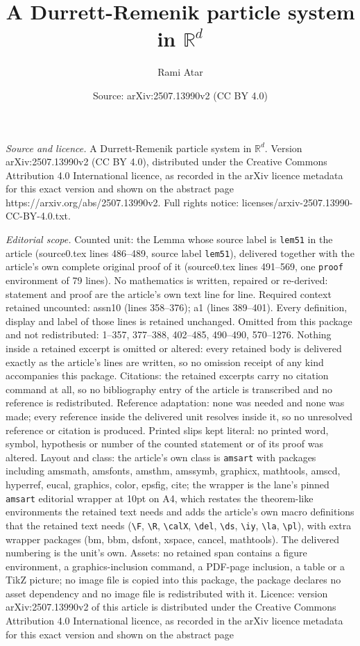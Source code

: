 \documentclass[10pt,a4paper]{amsart}
\title[A Durrett-Remenik particle system in $\mathbb{R}^d$]{A Durrett-Remenik particle system in $\mathbb{R}^d$}
\author{Rami Atar}
\date{Source: arXiv:2507.13990v2 (CC BY 4.0)}
\begin{document}
\maketitle

\noindent\emph{Source and licence.} A Durrett-Remenik particle system in $\mathbb{R}^d$. Version arXiv:2507.13990v2 (CC BY 4.0), distributed under the Creative Commons Attribution 4.0 International licence, as recorded in the arXiv licence metadata for this exact version and shown on the abstract page https://arxiv.org/abs/2507.13990v2. Full rights notice: licenses/arxiv-2507.13990-CC-BY-4.0.txt.\par\smallskip

\noindent\textit{Editorial scope.} Counted unit: the Lemma whose source label is \texttt{lem51} in the article (source0.tex lines 486--489, source label \texttt{lem51}), delivered together with the article's own complete original proof of it (source0.tex lines 491--569, one \texttt{proof} environment of 79 lines). No mathematics is written, repaired or re-derived: statement and proof are the article's own text line for line. Required context retained uncounted: assn10 (lines 358--376); a1 (lines 389--401). Every definition, display and label of those lines is retained unchanged. Omitted from this package and not redistributed: 1--357, 377--388, 402--485, 490--490, 570--1276. Nothing inside a retained excerpt is omitted or altered: every retained body is delivered exactly as the article's lines are written, so no omission receipt of any kind accompanies this package. Citations: the retained excerpts carry no citation command at all, so no bibliography entry of the article is transcribed and no reference is redistributed. Reference adaptation: none was needed and none was made; every reference inside the delivered unit resolves inside it, so no unresolved reference or citation is produced. Printed slips kept literal: no printed word, symbol, hypothesis or number of the counted statement or of its proof was altered. Layout and class: the article's own class is \texttt{amsart} with packages including amsmath, amsfonts, amsthm, amssymb, graphicx, mathtools, amscd, hyperref, eucal, graphics, color, epsfig, cite; the wrapper is the lane's pinned \texttt{amsart} editorial wrapper at 10pt on A4, which restates the theorem-like environments the retained text needs and adds the article's own macro definitions that the retained text needs (\texttt{\textbackslash F}, \texttt{\textbackslash R}, \texttt{\textbackslash calX}, \texttt{\textbackslash del}, \texttt{\textbackslash ds}, \texttt{\textbackslash iy}, \texttt{\textbackslash la}, \texttt{\textbackslash pl}), with extra wrapper packages (bm, bbm, dsfont, xspace, cancel, mathtools). The delivered numbering is the unit's own. Assets: no retained span contains a figure environment, a graphics-inclusion command, a PDF-page inclusion, a table or a TikZ picture; no image file is copied into this package, the package declares no asset dependency and no image file is redistributed with it. Licence: version arXiv:2507.13990v2 of this article is distributed under the Creative Commons Attribution 4.0 International licence, as recorded in the arXiv licence metadata for this exact version and shown on the abstract page 
\end{document}

